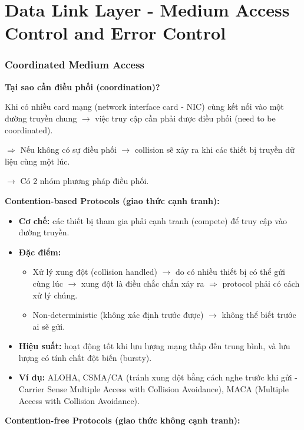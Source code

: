 \chapter{Data Link Layer - Medium Access Control and Error Control}
\chapterminitoc

\subsection{Coordinated Medium Access}

\noindent
\textbf{Tại sao cần điều phối (coordination)?}
\medskip

\noindent
Khi có nhiều card mạng (network interface card - NIC) cùng kết nối vào một đường truyền chung $\rightarrow$ việc truy cập cần phải được điều phối (need to be coordinated).

$\Rightarrow$ Nếu không có sự điều phối $\rightarrow$ collision sẽ xảy ra khi các thiết bị truyền dữ liệu cùng một lúc.
\medskip

\noindent
$\rightarrow$ Có 2 nhóm phương pháp điều phối.
\medskip

\noindent
\textbf{Contention-based Protocols (giao thức cạnh tranh):}

\begin{itemize}
    \item \textbf{Cơ chế:} các thiết bị tham gia phải cạnh tranh (compete) để truy cập vào đường truyền.
    \item \textbf{Đặc điểm:} \begin{itemize}
        \item Xử lý xung đột (collision handled) $\rightarrow$ do có nhiều thiết bị có thể gửi cùng lúc $\rightarrow$ xung đột là điều chắc chắn xảy ra $\Rightarrow$ protocol phải có cách xử lý chúng.
        \item Non-deterministic (không xác định trước được) $\rightarrow$ không thể biết trước ai sẽ gửi.
    \end{itemize}
    \item \textbf{Hiệu suất:} hoạt động tốt khi lưu lượng mạng thấp đến trung bình, và lưu lượng có tính chất đột biến (bursty).
    \item \textbf{Ví dụ:} ALOHA, CSMA/CA (tránh xung đột bằng cách nghe trước khi gửi - Carrier Sense Multiple Access with Collision Avoidance), MACA (Multiple Access with Collision Avoidance).
\end{itemize}
\medskip

\noindent
\textbf{Contention-free Protocols (giao thức không cạnh tranh):}

